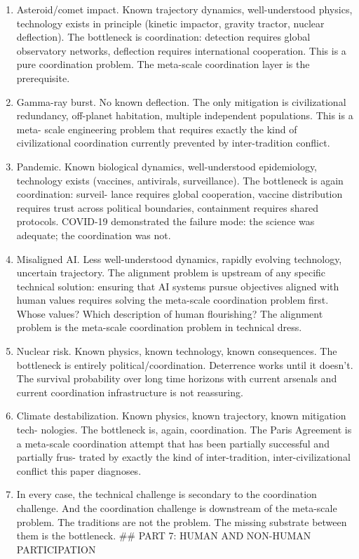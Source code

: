 \documentclass[
]{article}
\begin{document}
\begin{enumerate}
\def\labelenumi{\arabic{enumi}.}
\setcounter{enumi}{221}
\item
  Asteroid/comet impact. Known trajectory dynamics, well-understood
  physics, technology exists in principle (kinetic impactor, gravity
  tractor, nuclear deflection). The bottleneck is coordination:
  detection requires global observatory networks, deflection requires
  international cooperation. This is a pure coordination problem. The
  meta-scale coordination layer is the prerequisite.
\item
  Gamma-ray burst. No known deflection. The only mitigation is
  civilizational redundancy, off-planet habitation, multiple independent
  populations. This is a meta- scale engineering problem that requires
  exactly the kind of civilizational coordination currently prevented by
  inter-tradition conflict.
\item
  Pandemic. Known biological dynamics, well-understood epidemiology,
  technology exists (vaccines, antivirals, surveillance). The bottleneck
  is again coordination: surveil- lance requires global cooperation,
  vaccine distribution requires trust across political boundaries,
  containment requires shared protocols. COVID-19 demonstrated the
  failure mode: the science was adequate; the coordination was not.
\item
  Misaligned AI. Less well-understood dynamics, rapidly evolving
  technology, uncertain trajectory. The alignment problem is upstream of
  any specific technical solution: ensuring that AI systems pursue
  objectives aligned with human values requires solving the meta-scale
  coordination problem first. Whose values? Which description of human
  flourishing? The alignment problem is the meta-scale coordination
  problem in technical dress.
\item
  Nuclear risk. Known physics, known technology, known consequences. The
  bottleneck is entirely political/coordination. Deterrence works until
  it doesn't. The survival probability over long time horizons with
  current arsenals and current coordination infrastructure is not
  reassuring.
\item
  Climate destabilization. Known physics, known trajectory, known
  mitigation tech- nologies. The bottleneck is, again, coordination. The
  Paris Agreement is a meta-scale coordination attempt that has been
  partially successful and partially frus- trated by exactly the kind of
  inter-tradition, inter-civilizational conflict this paper diagnoses.
\item
  In every case, the technical challenge is secondary to the
  coordination challenge. And the coordination challenge is downstream
  of the meta-scale problem. The traditions are not the problem. The
  missing substrate between them is the bottleneck. \#\# PART 7: HUMAN
  AND NON-HUMAN PARTICIPATION
\end{enumerate}
\end{document}
